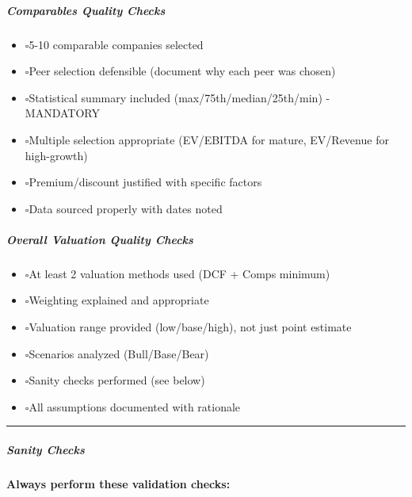 \documentclass[11pt]{article}
\newcommand{\UncheckedBox}{$\square$}
\begin{document}
\subparagraph{Comparables Quality Checks}\mbox{}\par
\begin{itemize}[leftmargin=*,itemsep=2pt,topsep=2pt]
\item {} \UncheckedBox 5-10 comparable companies selected
\item {} \UncheckedBox Peer selection defensible (document why each peer was chosen)
\item {} \UncheckedBox Statistical summary included (max/75th/median/25th/min) - MANDATORY
\item {} \UncheckedBox Multiple selection appropriate (EV/EBITDA for mature, EV/Revenue for high-growth)
\item {} \UncheckedBox Premium/discount justified with specific factors
\item {} \UncheckedBox Data sourced properly with dates noted
\end{itemize}

\subparagraph{Overall Valuation Quality Checks}\mbox{}\par
\begin{itemize}[leftmargin=*,itemsep=2pt,topsep=2pt]
\item {} \UncheckedBox At least 2 valuation methods used (DCF + Comps minimum)
\item {} \UncheckedBox Weighting explained and appropriate
\item {} \UncheckedBox Valuation range provided (low/base/high), not just point estimate
\item {} \UncheckedBox Scenarios analyzed (Bull/Base/Bear)
\item {} \UncheckedBox Sanity checks performed (see below)
\item {} \UncheckedBox All assumptions documented with rationale
\end{itemize}

\vspace{0.5em}\hrule\vspace{0.5em}

\subparagraph{Sanity Checks}\mbox{}\par

\textbf{Always perform these validation checks:}
\end{document}
